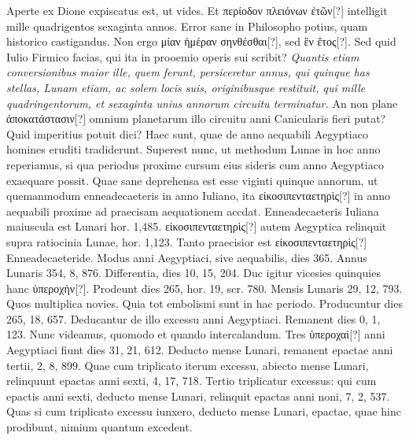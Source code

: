 Aperte
ex Dione expiscatus est, ut vides.
Et \textgreek{περίοδον πλειόνων ἐτῶν}[?] intelligit
mille quadrigentos sexaginta annos.
Error sane in Philosopho potius,
quam historico castigandus.
Non ergo \textgreek{μίαν ἡμέραν σηνθέσθαι}[?], sed
\textgreek{ἓν ἔτος}[?].
Sed quid Iulio Firmico facias, qui ita in prooemio
 operis sui
scribit?
\textit{Quantis etiam conversionibus maior ille, quem ferunt,
 persiceretur
annus, qui quinque has stellas, Lunam etiam, ac solem locis
suis, originibusque restituit, qui mille quadringentorum, et sexaginta
unius annorum circuitu terminatur.}
An non plane \textgreek{ἀποκατάστασιν}[?] omnium
planetarum illo circuitu anni Canicularis fieri putat?
Quid
imperitius potuit dici?
Haec sunt, quae de anno aequabili Aegyptiaco
homines eruditi tradiderunt.
Superest nunc, ut methodum Lunae in
hoc anno reperiamus, si qua periodus proxime cursum eius sideris
cum anno Aegyptiaco exaequare possit.
Quae sane deprehensa est esse
viginti quinque annorum, ut quemanmodum enneadecaeteris in anno
Iuliano, ita \textgreek{εἰκοσιπενταετηρὶς}[?]
 in anno aequabili proxime ad praecisam
aequationem accdat.
Enneadecaeteris Iuliana maiuscula est Lunari
hor. 1,485.
\textgreek{εἰκοσιπενταετηρὶς}[?]
 autem Aegyptica relinquit supra ratiocinia
Lunae, hor. 1,123.
Tanto praecisior est \textgreek{εἰκοσιπενταετηρὶς}[?] Enneadecaeteride.
Modus anni Aegyptiaci, sive aequabilis, dies 365.
Annus Lunaris
354, 8, 876.
Differentia, dies 10, 15, 204.
Duc igitur vicesies
quinquies hanc \textgreek{ὑπεροχὴν}[?].
Prodeunt dies 265, hor. 19, scr. 780.
Mensis
Lunaris 29, 12, 793.
Quos multiplica novies.
Quia tot embolismi sunt
in hac periodo.
Producuntur dies 265, 18, 657.
Deducantur de illo excessu
anni Aegyptiaci.
%
Remanent dies 0, 1, 123.
Nunc videamus,
quomodo et quando intercalandum.
Tres \textgreek{ὑπεροχαὶ}[?] anni Aegyptiaci
fiunt dies 31, 21, 612.
Deducto mense Lunari, remanent epactae anni
tertii, 2, 8, 899.
Quae cum triplicato iterum excessu, abiecto mense
Lunari, relinquunt epactas anni sexti, 4, 17, 718.
Tertio triplicatur
excessus: qui cum epactis anni sexti, deducto mense Lunari,
relinquit epactas anni noni, 7, 2, 537.
Quas si cum triplicato
excessu iunxero, deducto mense Lunari, epactae, quae hinc prodibunt,
nimium quantum excedent.
